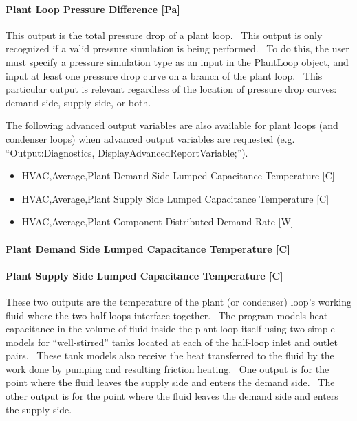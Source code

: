 \paragraph{Plant Loop Pressure Difference {[}Pa{]}}\label{plant-loop-pressure-difference-pa}

This output is the total pressure drop of a plant loop.~ This output is only recognized if a valid pressure simulation is being performed.~ To do this, the user must specify a pressure simulation type as an input in the PlantLoop object, and input at least one pressure drop curve on a branch of the plant loop.~ This particular output is relevant regardless of the location of pressure drop curves: demand side, supply side, or both.

The following advanced output variables are also available for plant loops (and condenser loops) when advanced output variables are requested (e.g. ``Output:Diagnostics, DisplayAdvancedReportVariable;'').

\begin{itemize}
\item
  HVAC,Average,Plant Demand Side Lumped Capacitance Temperature {[}C{]}
\item
  HVAC,Average,Plant Supply Side Lumped Capacitance Temperature {[}C{]}
\item
  HVAC,Average,Plant Component Distributed Demand Rate {[}W{]}
\end{itemize}

\paragraph{Plant Demand Side Lumped Capacitance Temperature {[}C{]}}\label{plant-demand-side-lumped-capacitance-temperature-c}

\paragraph{Plant Supply Side Lumped Capacitance Temperature {[}C{]}}\label{plant-supply-side-lumped-capacitance-temperature-c}

These two outputs are the temperature of the plant (or condenser) loop's working fluid where the two half-loops interface together.~ The program models heat capacitance in the volume of fluid inside the plant loop itself using two simple models for ``well-stirred'' tanks located at each of the half-loop inlet and outlet pairs.~ These tank models also receive the heat transferred to the fluid by the work done by pumping and resulting friction heating.~ One output is for the point where the fluid leaves the supply side and enters the demand side.~ The other output is for the point where the fluid leaves the demand side and enters the supply side.

